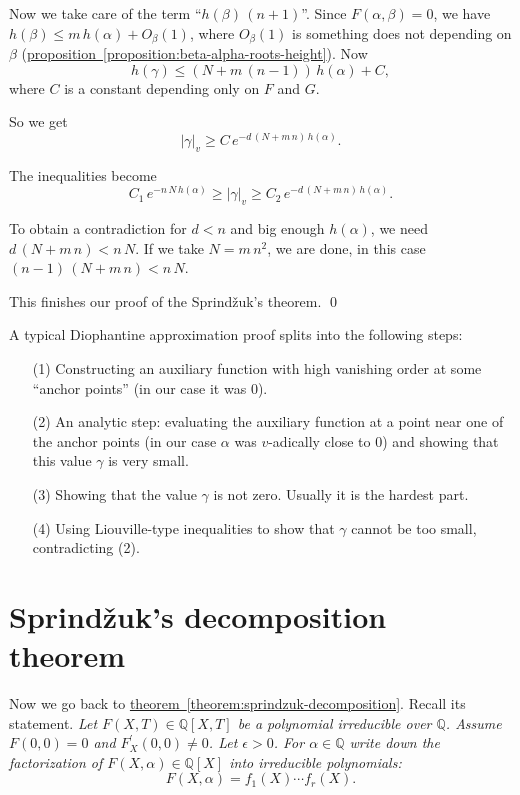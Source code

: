 \documentclass{article}
\newcommand{\QQ}{\mathbb{Q}}
\newcommand{\refref}[2]{\hyperref[#2]{#1~\ref*{#2}}}
\theoremstyle{myplain}
\theoremstyle{mydefinition}
\begin{document}
Now we take care of the term ``$h (\beta) \, (n+1)$''. Since
$F (\alpha,\beta) = 0$, we have $h (\beta) \le m \, h (\alpha) + O_\beta (1)$,
where $O_\beta (1)$ is something does not depending on $\beta$
(\refref{proposition}{proposition:beta-alpha-roots-height}). Now
$$h (\gamma) \le (N + m \, (n-1)) \, h (\alpha) + C,$$
where $C$ is a constant depending only on $F$ and $G$.

So we get
$$|\gamma|_v \ge C \, e^{-d \, (N + m\,n) \, h (\alpha)}.$$

The inequalities become
\[ C_1 \, e^{-n\,N\,h(\alpha)} \ge |\gamma|_v \ge
  C_2 \, e^{-d \, (N + m\,n) \, h (\alpha)}. \]

To obtain a contradiction for $d < n$ and big enough $h (\alpha)$, we need
$d \, (N + m\,n) < n\,N$. If we take $N = m\,n^2$, we are done, in this case
$(n-1) \, (N + m\,n) < n\,N$.

This finishes our proof of the Sprind\v{z}uk's theorem. \qed

\vspace{1em}

A typical Diophantine approximation proof splits into the following steps:

\begin{enumerate}
\item[(1)] Constructing an auxiliary function with high vanishing order at some
  ``anchor points'' (in our case it was $0$).

\item[(2)] An analytic step: evaluating the auxiliary function at a point near
  one of the anchor points (in our case $\alpha$ was $v$-adically close to $0$)
  and showing that this value $\gamma$ is very small.

\item[(3)] Showing that the value $\gamma$ is not zero. Usually it is the
  hardest part.

\item[(4)] Using Liouville-type inequalities to show that $\gamma$ cannot be too
  small, contradicting (2).
\end{enumerate}

\section{Sprind\v{z}uk's decomposition theorem}
\label{section:Sprindzuk-decomposition}

Now we go back to \refref{theorem}{theorem:sprindzuk-decomposition}. Recall its
statement. \emph{Let $F (X,T) \in \QQ [X,T]$ be a polynomial irreducible over
  $\QQ$. Assume $F (0,0) = 0$ and $F^\prime_X (0,0) \ne 0$. Let $\epsilon >
  0$. For $\alpha \in \QQ$ write down the factorization of
  $F (X,\alpha) \in \QQ [X]$ into irreducible polynomials:}
\[ F (X,\alpha) = f_1 (X) \cdots f_r (X). \]
\end{document}
